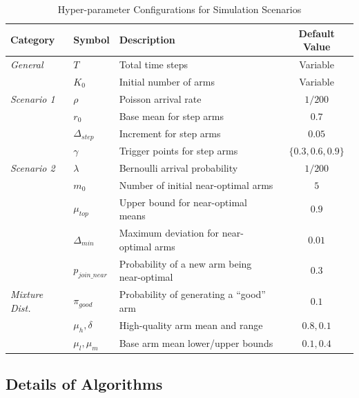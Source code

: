\documentclass[
  12pt]{article}
\begin{document}
\begin{table}[htbp]
\centering
\caption{Hyper-parameter Configurations for Simulation Scenarios}
\label{tab:hyper-parameters}
\begin{tabular}{lllc}
\hline
\textbf{Category} & \textbf{Symbol} & \textbf{Description} & \textbf{Default Value} \\ \hline
\textit{General} & $T$ & Total time steps & Variable \\
& $K_0$ & Initial number of arms & Variable \\ \hline
\textit{Scenario 1} & $\rho$ & Poisson arrival rate & $1/200$ \\
& $r_0$ & Base mean for step arms & $0.7$ \\
& $\Delta_{step}$ & Increment for step arms & $0.05$ \\
& $\gamma$ & Trigger points for step arms & $\{0.3, 0.6, 0.9\}$ \\ \hline
\textit{Scenario 2} & $\lambda$ & Bernoulli arrival probability & $1/200$ \\
& $m_0$ & Number of initial near-optimal arms & $5$ \\
& $\mu_{top}$ & Upper bound for near-optimal means & $0.9$ \\
& $\Delta_{min}$ & Maximum deviation for near-optimal arms & $0.01$ \\
& $p_{join\_near}$ & Probability of a new arm being near-optimal & $0.3$ \\ \hline
\textit{Mixture Dist.} & $\pi_{good}$ & Probability of generating a ``good'' arm & $0.1$ \\
& $\mu_h, \delta$ & High-quality arm mean and range & $0.8, 0.1$ \\
& $\mu_l, \mu_m$ & Base arm mean lower/upper bounds & $0.1, 0.4$ \\ \hline
\end{tabular}
\end{table}

\newpage
\subsection{Details of Algorithms}
\end{document}

